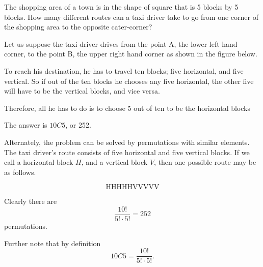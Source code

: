 \begin{example}
    The shopping area of a town is in the shape of square that is 5 blocks by 5 blocks. How many different routes can a taxi driver take to go from one corner of the shopping area to the opposite cater-corner?
\end{example}
\begin{solution}
    Let us suppose the taxi driver drives from the point A, the lower left hand corner, to the point B, the upper right hand corner as shown in the figure below.

    \begin{center}
    \end{center}

    To reach his destination, he has to travel ten blocks; five horizontal, and five vertical. So if out of the ten blocks he chooses any five horizontal, the other five will have to be the vertical blocks, and vice versa.

    Therefore, all he has to do is to choose 5 out of ten to be the horizontal blocks

    The answer is \( 10C5 \), or 252.

    Alternately, the problem can be solved by permutations with similar elements. The taxi driver's route consists of five horizontal and five vertical blocks. If we call a horizontal block \( H \), and a vertical block \( V \), then one possible route may be as follows.

    \[
        \text{HHHHHVVVVV}
    \]

    Clearly there are
    \[
        \frac{10!}{5! \cdot 5!} = 252
    \]
    permutations.

    Further note that by definition
    \[
        10C5 = \frac{10!}{5! \cdot 5!} \text{.}
    \]

\end{solution}

